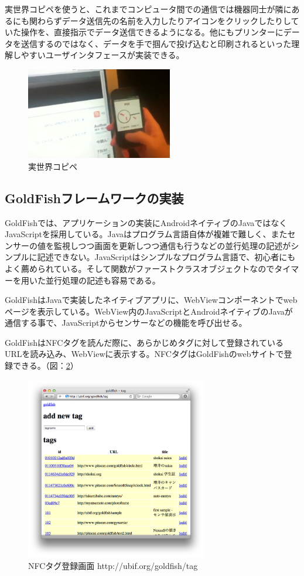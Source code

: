 実世界コピペを使うと、これまでコンピュータ間での通信では機器同士が隣にあるにも関わらずデータ送信先の名前を入力したりアイコンをクリックしたりしていた操作を、直接指示でデータ送信できるようになる。他にもプリンターにデータを送信するのではなく、データを手で掴んで投げ込むと印刷されるといった理解しやすいユーザインタフェースが実装できる。

\begin{figure}
  \begin{center}
    \includegraphics[height=40mm]{img/copy-paste.jpg}
  \end{center}
  \caption{実世界コピペ}
  \label{fig:copy-paste}
\end{figure}


\subsection{GoldFishフレームワークの実装}
GoldFishでは、アプリケーションの実装にAndroidネイティブのJavaではなくJavaScriptを採用している。Javaはプログラム言語自体が複雑で難しく、またセンサーの値を監視しつつ画面を更新しつつ通信も行うなどの並行処理の記述がシンプルに記述できない。JavaScriptはシンプルなプログラム言語で、初心者にもよく薦められている。そして関数がファーストクラスオブジェクトなのでタイマーを用いた並行処理の記述も容易である。

GoldFishはJavaで実装したネイティブアプリに、WebViewコンポーネントでwebページを表示している。WebView内のJavaScriptとAndroidネイティブのJavaが通信する事で、JavaScriptからセンサーなどの機能を呼び出せる。

GoldFishはNFCタグを読んだ際に、あらかじめタグに対して登録されているURLを読み込み、WebViewに表示する。NFCタグはGoldFishのwebサイトで登録できる。（図：\ref{fig:tags}）
\begin{figure}
  \begin{center}
    \includegraphics[height=80mm]{img/tags.png}
  \end{center}
  \caption{NFCタグ登録画面 http://ubif.org/goldfish/tag}
  \label{fig:tags}
\end{figure}


